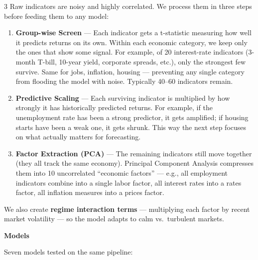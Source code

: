 \documentclass[12pt]{article}
\newcommand{\postersection}[1]{%
  \vspace{0.5em}
  \noindent
  \hspace*{-\leftskip}%
  \colorbox{rhgreen}{\parbox{\dimexpr\linewidth-\rightskip-2\fboxsep\relax}{\textcolor{rhbg}{\textbf{\LARGE #1}}}}\par
  \vspace{0.3em}
}
\begin{document}
\begin{multicols}{3}
\large
Raw indicators are noisy and highly correlated. We process them in three
steps before feeding them to any model:
\begin{enumerate}
  \setlength\itemsep{0.2em}
  \item \textbf{Group-wise Screen} --- Each indicator gets a t-statistic
        measuring how well it predicts returns on its own. Within each
        economic category, we keep only the ones that show some signal.
        For example, of 20 interest-rate indicators (3-month T-bill,
        10-year yield, corporate spreads, etc.), only the strongest
        few survive. Same for jobs, inflation, housing --- preventing
        any single category from flooding the model with noise.
        Typically 40--60 indicators remain.
  \item \textbf{Predictive Scaling} --- Each surviving indicator is
        multiplied by how strongly it has historically predicted returns.
        For example, if the unemployment rate has been a strong predictor,
        it gets amplified; if housing starts have been a weak one, it
        gets shrunk. This way the next step focuses on what actually
        matters for forecasting.
  \item \textbf{Factor Extraction (PCA)} --- The remaining indicators
        still move together (they all track the same economy). Principal
        Component Analysis compresses them into 10 uncorrelated
        ``economic factors'' --- e.g., all employment indicators combine
        into a single labor factor, all interest rates into a rates
        factor, all inflation measures into a prices factor.
\end{enumerate}

We also create \textbf{regime interaction terms} --- multiplying each factor
by recent market volatility --- so the model adapts to calm vs.\ turbulent
markets.

\columnbreak

\postersection{Models}

\large
Seven models tested on the same pipeline:
\vspace{0.3em}


\end{multicols}
\end{document}
